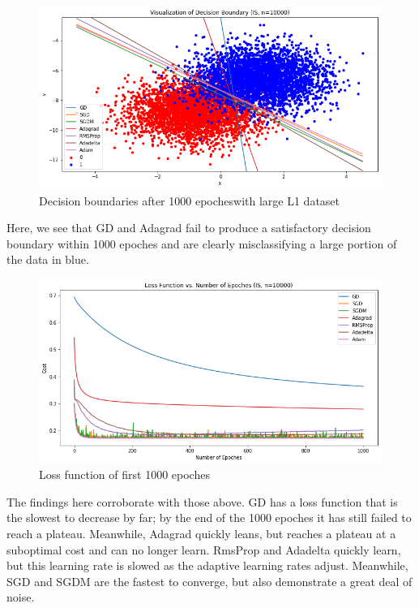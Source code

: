 \documentclass[twoside,11pt]{homework}
\begin{document}
\begin{figure}[H]
		\centering
		\includegraphics[scale=.5]{q5/insep_10000/lines.png}	
		\caption{Decision boundaries after 1000 epocheswith large L1 dataset}
	\end{figure}
	
Here, we see that GD and Adagrad fail to produce a satisfactory decision boundary within 1000 epoches and are clearly misclassifying a large portion of the data in blue.

	\begin{figure}[H]
		\centering
		\includegraphics[scale=.5]{q5/insep_10000/loss_n1000.png}	
		\caption{Loss function of first 1000 epoches}
	\end{figure}
The findings here corroborate with those above. GD has a loss function that is the slowest to decrease by far; by the end of the 1000 epoches it has still failed to reach a plateau. Meanwhile, Adagrad quickly leans, but reaches a plateau at a suboptimal cost and can no longer learn. RmsProp and Adadelta quickly learn, but this learning rate is slowed as the adaptive learning rates adjust. Meanwhile, SGD and SGDM are the fastest to converge, but also demonstrate a great deal of noise.
\end{document}
